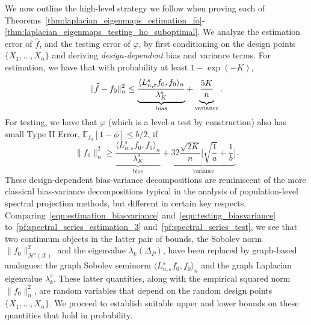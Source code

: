 \documentclass[aos]{imsart}
\theoremstyle{plain}
\theoremstyle{definition}
\theoremstyle{remark}
\newcommand{\Ebb}{\mathbb{E}}
\newcommand{\dotp}[2]{\langle #1, #2 \rangle}
\newcommand{\wh}[1]{\widehat{#1}}
\newcommand{\mc}[1]{\mathcal{#1}}
\newcommand{\1}{\mathbf{1}}
\begin{document}
We now outline the high-level strategy we follow when proving each of Theorems~\ref{thm:laplacian_eigenmaps_estimation_fo}-\ref{thm:laplacian_eigenmaps_testing_ho_suboptimal}. We analyze the estimation error of $\wh{f}$, and the testing error of $\varphi$, by first conditioning on the design points $\{X_1,\ldots,X_n\}$ and deriving \emph{design-dependent} bias and variance terms. For estimation, we have that with probability at least $1 - \exp(-K)$,
\begin{equation}
\label{eqn:estimation_biasvariance}
\|\wh{f} - f_0\|_n^2 \leq \underbrace{\frac{\dotp{L_{n,\varepsilon}^s f_0}{f_0}_n}{\lambda_{K}^s}}_{\textrm{bias}} + \underbrace{\frac{5K}{n} \vphantom{\frac{\dotp{L^s f_0}{f_0}_n}{\lambda_{K}^s}}}_{\textrm{variance}}.
\end{equation}
For testing, we have that $\varphi$ (which is a level-$a$ test by construction) also has small Type II Error, $\Ebb_{f_0}[1 - \phi] \leq b/2$, if 
\begin{equation}
\label{eqn:testing_biasvariance}
\|f_0\|_n^2 \geq  \underbrace{\frac{\dotp{L_{n,\varepsilon}^s f_0}{f_0}_n}{\lambda_{K}^s}}_{\textrm{bias}} + \underbrace{32\frac{\sqrt{2K}}{n}\biggl[\sqrt{\frac{1}{a}} + \frac{1}{b}\biggr]}_{\textrm{variance}}.
\end{equation}
These design-dependent bias-variance decompositions are reminiscent of the more classical bias-variance decompositions typical in the analysis of population-level spectral projection methods, but different in certain key respects. Comparing~\eqref{eqn:estimation_biasvariance} and~\eqref{eqn:testing_biasvariance} to~\eqref{pf:spectral_series_estimation_3} and~\eqref{pf:spectral_series_test}, we see that two continuum objects in the latter pair of bounds, the Sobolev norm $\|f_0\|_{\mc{H}^s(\mc{X})}^2$ and the eigenvalue $\lambda_k(\Delta_P)$, have been replaced by graph-based analogues: the graph Sobolev seminorm $\dotp{L_{n,\varepsilon}^sf_0}{f_0}_n$ and the graph Laplacian eigenvalue $\lambda_k^s$. These latter quantities, along with the empirical squared norm $\|f_0\|_n^2$, are random variables that depend on the random design points $\{X_1,\ldots,X_n\}$. We proceed to establish suitable upper and lower bounds on these quantities that hold in probability. 
\end{document}
